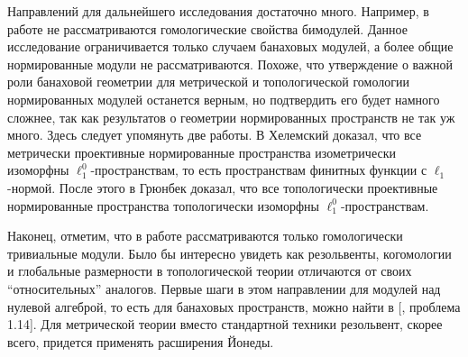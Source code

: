Направлений для дальнейшего исследования достаточно много. Например, в работе не рассматриваются гомологические свойства бимодулей. Данное исследование ограничивается только случаем банаховых модулей, а более общие нормированные модули не рассматриваются. Похоже, что утверждение о важной роли банаховой геометрии для метрической и топологической гомологии нормированных модулей останется верным, но подтвердить его будет намного сложнее, так как результатов о геометрии нормированных пространств не так уж много. Здесь следует упомянуть две работы. В \cite{HelMetrFrQMod} Хелемский доказал, что все метрически проективные нормированные пространства изометрически изоморфны $\ell_1^0$-пространствам, то есть пространствам финитных функции с $\ell_1$-нормой. После этого в \cite{GronbeakLiftProblmNorSp} Грюнбек доказал, что все топологически проективные нормированные пространства топологически изоморфны $\ell_1^0$-пространствам. 

Наконец, отметим, что в работе рассматриваются только гомологически тривиальные модули. Было бы интересно увидеть как резольвенты, когомологии и глобальные размерности в топологической теории отличаются от своих ``относительных'' аналогов. Первые шаги в этом направлении для модулей над нулевой алгеброй, то есть для банаховых пространств, можно найти в [\cite{HavLinComplAnalPrblmBook}, проблема 1.14]. Для метрической теории вместо стандартной техники резольвент, скорее всего, придется применять расширения Йонеды. 

\clearpage